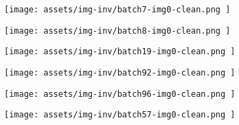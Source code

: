 \begin{figure*}[t]
\centering
\footnotesize
    \begin{minipage}[t]{.025\textwidth}
         \vspace{11mm}
    \end{minipage}%
    \begin{minipage}[t]{.98\textwidth}
        \vspace{0pt}
            \begin{subfigure}[t]{0.16\textwidth}
                    \texttt{[image:  assets/img-inv/batch7-img0-clean.png ]}
            \end{subfigure}%
                \hspace{0.5mm}%
            \begin{subfigure}[t]{0.16\textwidth}
                    \texttt{[image:  assets/img-inv/batch8-img0-clean.png ]}
            \end{subfigure}%
                \hspace{0.5mm}%
            \begin{subfigure}[t]{0.16\textwidth}
                    \texttt{[image:  assets/img-inv/batch19-img0-clean.png ]}
            \end{subfigure}%
                \hspace{0.5mm}%
            \begin{subfigure}[t]{0.16\textwidth}
                    \texttt{[image:  assets/img-inv/batch92-img0-clean.png ]}
            \end{subfigure}%
                \hspace{0.5mm}%
            \begin{subfigure}[t]{0.16\textwidth}
                    \texttt{[image:  assets/img-inv/batch96-img0-clean.png ]}
            \end{subfigure}%
                \hspace{0.5mm}%
            \begin{subfigure}[t]{0.16\textwidth}
                    \texttt{[image:  assets/img-inv/batch57-img0-clean.png ]}
            \end{subfigure}%
    \end{minipage}


\end{figure*}
